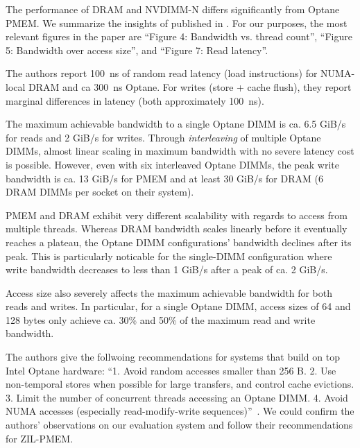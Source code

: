 \documentclass[12pt,a4paper,twoside]{book}
\begin{document}
The performance of DRAM and NVDIMM-N differs significantly from Optane PMEM.
We summarize the insights of \citeauthor{yangEmpiricalGuideBehavior2020} published in \cite{yangEmpiricalGuideBehavior2020}.
For our purposes, the most relevant figures in the paper are ``Figure 4: Bandwidth vs. thread count'', ``Figure 5: Bandwidth over access size'', and ``Figure 7: Read latency''.
\begin{description}[noitemsep]
    \item[Latency] The authors report 100~ns of random read latency (load instructions) for NUMA-local DRAM and ca 300~ns Optane.
        For writes (store + cache flush), they report marginal differences in latency (both approximately 100~ns).
    \item[Maximum Bandwidth] The maximum achievable bandwidth to a single Optane DIMM is ca. 6.5 GiB/s for reads and 2 GiB/s for writes.
        Through \textit{interleaving} of multiple Optane DIMMs, almost linear scaling in maximum bandwidth with no severe latency cost is possible.
        However, even with six interleaved Optane DIMMs, the peak write bandwidth is ca. 13 GiB/s for PMEM and at least 30 GiB/s for DRAM (6 DRAM DIMMs per socket on their system).
    \item[Scalability] PMEM and DRAM exhibit very different scalability with regards to access from multiple threads.
        Whereas DRAM bandwidth scales linearly before it eventually reaches a plateau, the Optane DIMM configurations' bandwidth declines after its peak.
        This is particularly noticable for the single-DIMM configuration where write bandwidth decreases to less than 1 GiB/s after a peak of ca. 2 GiB/s.
    \item[Access Granularity] Access size also severely affects the maximum achievable bandwidth for both reads and writes.
        In particular, for a single Optane DIMM, access sizes of 64 and 128 bytes only achieve ca. 30\% and 50\% of the maximum read and write bandwidth.
\end{description}
The authors give the follwoing recommendations for systems that build on top Intel Optane hardware:
``1. Avoid random accesses smaller than 256 B.
2. Use non-temporal stores when possible for large transfers, and control cache evictions.
3. Limit the number of concurrent threads accessing an Optane DIMM.
4. Avoid NUMA accesses (especially read-modify-write sequences)''~\cite{yangEmpiricalGuideBehavior2020}.
We could confirm the authors' observations on our evaluation system and follow their recommendations for ZIL-PMEM.
\end{document}
